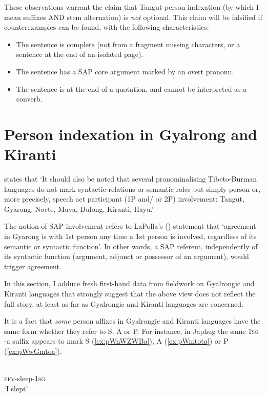 \documentclass[oldfontcommands,oneside,a4paper,11pt]{article}
\newcommand{\ipa}[1]{{\phon \mbox{#1}}} %
\begin{document}
These observations warrant the claim that Tangut person indexation (by which I mean suffixes AND stem alternation) is \textit{not} optional. This claim will be falsified if counterexamples can be found, with the following characteristics:

\begin{itemize}
\item The sentence is complete (not from a fragment missing characters, or a sentence at the end of an isolated page).
\item The sentence has a SAP core argument marked by an overt pronoun.
\item The sentence is at the end of a quotation, and cannot be interpreted as a converb.
\end{itemize}

\section{Person indexation in Gyalrong and Kiranti} \label{sec:rgyalrong}
\citet[53]{zeisler15eat} states that `It should also be noted that several pronominalising Tibeto-Burman languages do not mark syntactic relations or semantic roles but simply person or, more precisely, speech act participant (1P and/ or 2P) involvement: Tangut, Gyarong, Nocte, Muya, Dulong, Kiranti, Hayu.' 

The notion of SAP involvement refers to LaPolla's (\citeyear[308]{lapolla92}) statement that `agreement in Gyarong is with 1st person any time a 1st person is involved, regardless of its semantic or syntactic function'. In other words, a SAP referent, independently of its syntactic function (argument, adjunct or possessor of an argument), would trigger agreement. 

In this section,  I adduce fresh first-hand data from fieldwork on Gyalrongic and Kiranti languages that strongly suggest that the above view does not reflect the full story, at least as far as Gyalrongic and Kiranti languages are concerned.

It is a fact that \textit{some} person affixes in Gyalrongic and Kiranti languages have the same form whether they refer to S, A or P. For instance, in Japhug the same \textsc{1sg} \ipa{-a} suffix appears to mark S (\ref{ex:pWnWZWBa}), A (\ref{ex:pWmtota}) or P (\ref{ex:pWwGmtoa}).

\begin{exe}
\ex \label{ex:pWnWZWBa}
\gll \ipa{pɯ-nɯʑɯβ-a} \\
\textsc{pfv}-sleep-\textsc{1sg} \\
\glt `I slept'.
\end{exe}
\end{document}
